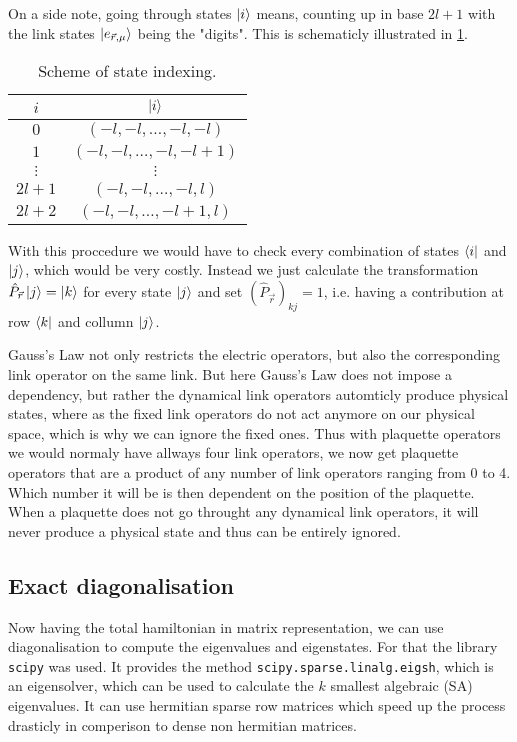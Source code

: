 On a side note, going through states $\ket{i}$ means, counting up in base $2l+1$ with the link states $\ket{e_{\vec{r}, \mu}}$ being the "digits". This is schematicly illustrated in \cref{tab:steidx}.

\begin{table}[h]
		\begin{tabular}{c|c}
			$i$      & $\ket{i}$               \\
			\hline
			$0$      & $(-l,-l,\dots, -l,-l)$  \\
			$1$      & $(-l,-l,\dots,-l,-l+1)$ \\
			$\vdots$ & $\vdots$                \\
			$2l+1$   & $(-l,-l,\dots,-l,l)$    \\
			$2l+2$   & $(-l,-l,\dots,-l+1,l)$
		\end{tabular}
		\caption{Scheme of state indexing.}\label{tab:steidx}
\end{table}

With this proccedure we would have to check every combination of states $\bra{i}$ and $\ket{j}$, which would be very costly. Instead we just calculate the transformation $\hat{P}_{\vec{r}}\ket{j}=\ket{k}$ for every state $\ket{j}$ and set $(\hat{P}_{\vec{r}})_{kj}=1$, i.e. having a contribution at row $\bra{k}$ and collumn $\ket{j}$.

Gauss's Law not only restricts the electric operators, but also the corresponding link operator on the same link. But here Gauss's Law does not impose a dependency, but rather the dynamical link operators automticly produce physical states, where as the fixed link operators do not act anymore on our physical space, which is why we can ignore the fixed ones. Thus with plaquette operators we would normaly have allways four link operators, we now get plaquette operators that are a product of any number of link operators ranging from 0 to 4. Which number it will be is then dependent on the position of the plaquette. When a plaquette does not go throught any dynamical link operators, it will never produce a physical state and thus can be entirely ignored.

\subsection{Exact diagonalisation}
Now having the total hamiltonian in matrix representation, we can use diagonalisation to compute the eigenvalues and eigenstates. For that the library \texttt{scipy}\cite{2020SciPy-NMeth} was used. It provides the method \texttt{scipy.sparse.linalg.eigsh}, which is an eigensolver, which can be used to calculate the $k$ smallest algebraic (SA) eigenvalues. It can use hermitian sparse row matrices which speed up the process drasticly in comperison to dense non hermitian matrices.

